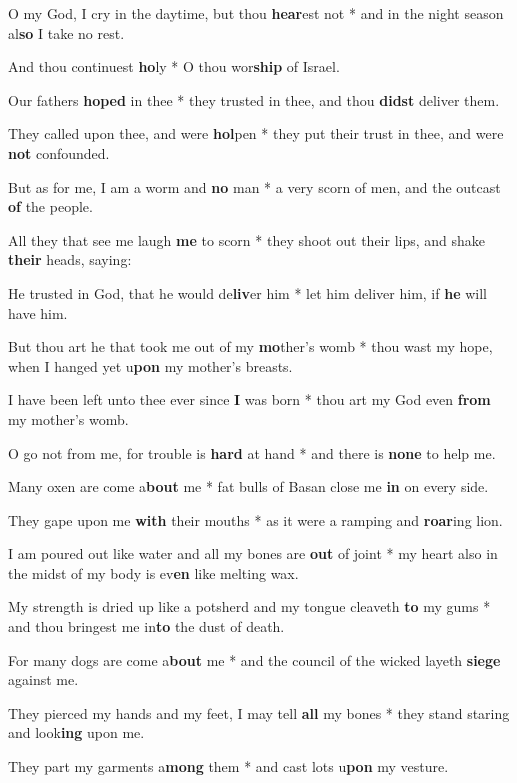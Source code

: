\begin{multicols}{2}
	O my God, I cry in the daytime, but thou \textbf{hear}est not * and in the night season al\textbf{so} I take no rest.
	
	And thou continuest \textbf{ho}ly * O thou wor\textbf{ship} of Israel.
	
	Our fathers \textbf{hoped} in thee * they trusted in thee, and thou \textbf{didst} deliver them.
	
	They called upon thee, and were \textbf{hol}pen * they put their trust in thee, and were \textbf{not} confounded.
	
	But as for me, I am a worm and \textbf{no} man * a very scorn of men, and the outcast \textbf{of} the people.
	
	All they that see me laugh \textbf{me} to scorn * they shoot out their lips, and shake \textbf{their} heads, saying:
	
	He trusted in God, that he would de\textbf{liv}er him * let him deliver him, if \textbf{he} will have him.
	
	But thou art he that took me out of my \textbf{mo}ther's womb * thou wast my hope, when I hanged yet u\textbf{pon} my mother's breasts.
	
	I have been left unto thee ever since \textbf{I} was born * thou art my God even \textbf{from} my mother's womb.
	
	O go not from me, for trouble is \textbf{hard} at hand * and there is \textbf{none} to help me.
	
	Many oxen are come a\textbf{bout} me * fat bulls of Basan close me \textbf{in} on every side.
	
	They gape upon me \textbf{with} their mouths * as it were a ramping and \textbf{roar}ing lion.
	
	I am poured out like water and all my bones are \textbf{out} of joint * my heart also in the midst of my body is ev\textbf{en} like melting wax.
	
	My strength is dried up like a potsherd and my tongue cleaveth \textbf{to} my gums * and thou bringest me in\textbf{to} the dust of death.
	
	For many dogs are come a\textbf{bout} me * and the council of the wicked layeth \textbf{siege} against me.
	
	They pierced my hands and my feet, I may tell \textbf{all} my bones * they stand staring and look\textbf{ing} upon me.
	
	They part my garments a\textbf{mong} them * and cast lots u\textbf{pon} my vesture.
	

\end{multicols}
